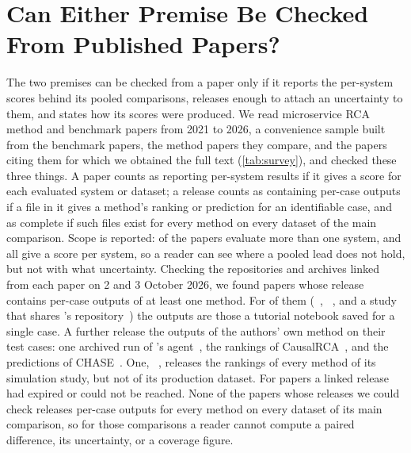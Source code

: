 \section{Can Either Premise Be Checked From Published Papers?}
\label{sec:bg-survey}

The two premises can be checked from a paper only if it reports the per-system scores behind its pooled comparisons, releases enough to attach an uncertainty to them, and states how its scores were produced.
We read \SurveyN microservice RCA method and benchmark papers from 2021 to 2026, a convenience sample built from the benchmark papers, the method papers they compare, and the papers citing them for which we obtained the full text (\cref{tab:survey}), and checked these three things.
A paper counts as reporting per-system results if it gives a score for each evaluated system or dataset; a release counts as containing per-case outputs if a file in it gives a method's ranking or prediction for an identifiable case, and as complete if such files exist for every method on every dataset of the main comparison.
Scope is reported: \SurveyMulti of the \SurveyN papers evaluate more than one system, and all \SurveyMulti give a score per system, so a reader can see where a pooled lead does not hold, but not with what uncertainty.
Checking the repositories and archives linked from each paper on 2 and 3 October 2026, we found \SurveyRelAny papers whose release contains per-case outputs of at least one method.
For \SurveyRelDemo of them (\baro~\citep{pham2024baro}, \rcaeval~\citep{pham2024rcaeval}, and a study that shares \rcaeval's repository~\citep{pham2024howfar}) the outputs are those a tutorial notebook saved for a single case.
A further \SurveyRelOwn release the outputs of the authors' own method on their test cases: one archived run of \openrca's agent~\citep{xu2025openrca}, the rankings of CausalRCA~\citep{causalrca}, and the predictions of CHASE~\citep{zhao2024chase}.
One, \circa~\citep{li2022circa}, releases the rankings of every method of its simulation study, but not of its production dataset.
For \SurveyRelUndet papers a linked release had expired or could not be reached.
None of the \SurveyRelFullCheckable papers whose releases we could check releases per-case outputs for every method on every dataset of its main comparison, so for those comparisons a reader cannot compute a paired difference, its uncertainty, or a coverage figure.
\begin{table}[t]
\caption{The \SurveyN surveyed papers. Per-system: a score per evaluated system is reported (single system: one system evaluated). Per-case outputs released: what the release linked from the paper contains, checked on 2 and 3 October 2026. All methods: whether per-case outputs exist for every method on every dataset of the main comparison (partial: for every method of one experiment).}
\label{tab:survey}
\scriptsize

\end{table}

